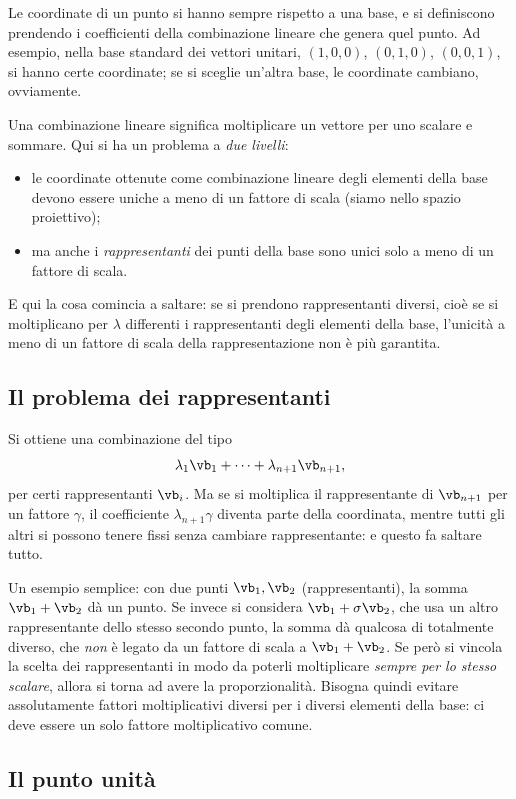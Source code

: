 Le coordinate di un punto si hanno sempre rispetto a una base, e si definiscono prendendo i coefficienti della combinazione lineare che genera quel punto. Ad esempio, nella base standard dei vettori unitari, $(1,0,0)$, $(0,1,0)$, $(0,0,1)$, si hanno certe coordinate; se si sceglie un'altra base, le coordinate cambiano, ovviamente.

Una combinazione lineare significa moltiplicare un vettore per uno scalare e sommare. Qui si ha un problema a \emph{due livelli}:
\begin{itemize}
  \item le coordinate ottenute come combinazione lineare degli elementi della base devono essere uniche a meno di un fattore di scala (siamo nello spazio proiettivo);
  \item ma anche i \emph{rappresentanti} dei punti della base sono unici solo a meno di un fattore di scala.
\end{itemize}
E qui la cosa comincia a saltare: se si prendono rappresentanti diversi, cioè se si moltiplicano per $\lambda$ differenti i rappresentanti degli elementi della base, l'unicità a meno di un fattore di scala della rappresentazione non è più garantita.

\subsection{Il problema dei rappresentanti}

Si ottiene una combinazione del tipo
\[
  \lambda_1\vb_1+\dots+\lambda_{n+1}\vb_{n+1},
\]
per certi rappresentanti $\vb_i$. Ma se si moltiplica il rappresentante di $\vb_{n+1}$ per un fattore $\gamma$, il coefficiente $\lambda_{n+1}\gamma$ diventa parte della coordinata, mentre tutti gli altri si possono tenere fissi senza cambiare rappresentante: e questo fa saltare tutto.

Un esempio semplice: con due punti $\vb_1,\vb_2$ (rappresentanti), la somma $\vb_1+\vb_2$ dà un punto. Se invece si considera $\vb_1+\sigma\vb_2$, che usa un altro rappresentante dello stesso secondo punto, la somma dà qualcosa di totalmente diverso, che \emph{non} è legato da un fattore di scala a $\vb_1+\vb_2$. Se però si vincola la scelta dei rappresentanti in modo da poterli moltiplicare \emph{sempre per lo stesso scalare}, allora si torna ad avere la proporzionalità. Bisogna quindi evitare assolutamente fattori moltiplicativi diversi per i diversi elementi della base: ci deve essere un solo fattore moltiplicativo comune.

\subsection{Il punto unità}

